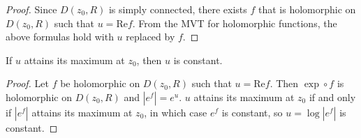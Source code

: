\begin{proof}
Since $D(z_0, R)$ is simply connected, there exists $f$ that is
holomorphic on $D(z_0, R)$ such that $u = \mathrm{Re} f$. From the
MVT for holomorphic functions, the above formulas hold with
$u$ replaced by $f$.
\end{proof}

\begin{corol}
If $u$ attains its maximum at $z_0$, then $u$ is constant.
\end{corol}
\begin{proof}
Let $f$ be holomorphic on $D(z_0, R)$ such that $u = \mathrm{Re} f$.
Then $\exp \circ f$ is holomorphic on $D(z_0, R)$ and $|e^f| = e^u$.
$u$ attains its maximum at $z_0$ if and only if $|e^f|$ attains its
maximum at $z_0$, in which case $e^f$ is constant, so
$u = \log |e^f|$ is constant.
\end{proof}


